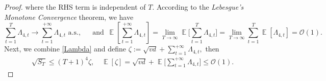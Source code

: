 \documentclass[standalone]{article}
\DeclareMathOperator{\Expect}{\mathbb{E}}
\begin{document}
\begin{proof}
where the RHS term is independent of $T$. According to the \emph{Lebesgue's Monotone Convergence} theorem, we have 
\[\sum_{t=1}^{T}\Lambda_{4,t} \to \sum_{t=1}^{+\infty}\Lambda_{4,t} \,\, \text{a.s.}, \quad\,\text{ and } \, 
\Expect\left[\sum_{t=1}^{+\infty}\Lambda_{4,t}\right] = \lim_{T \to \infty} \Expect\Bigg[\sum_{t=1}^{T}\Lambda_{4,t}\Bigg] = \lim_{T \to \infty} \sum_{t=1}^{T} \Expect[\Lambda_{4,t}] =\mathcal{O}(1).
\]
Next, we combine \cref{Lambda} and define $\zeta :=  \sqrt{vd} + \sum_{t=1}^{+\infty}\Lambda_{4,t},$
then
\begin{align}%
\sqrt{S_{T}}\le  (T+1)^{4}\zeta, \quad 
\Expect[\zeta]=\sqrt{vd}+\Expect\Bigg[\sum_{t=1}^{+\infty}\Lambda_{4,t}\Bigg] \leq \mathcal{O}(1).
\end{align}
\end{proof}
 
\end{document}
